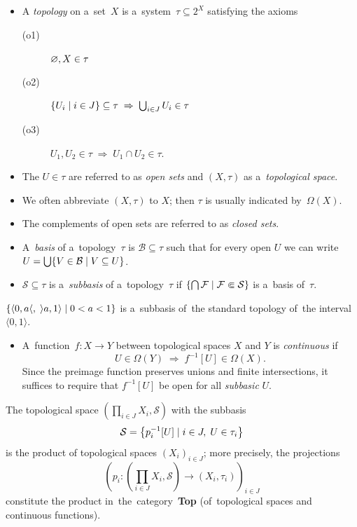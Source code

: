 \begin{itemize}
\item A \emph{topology} on a~set~$X$ is a~system~$\tau\subseteq 2^X$ satisfying
the axioms
  \begin{description}
  \item[(o1)] $\varnothing, X \in \tau$
  \item[(o2)] $\left\{ U_i \mid i\in J \right\} \subseteq \tau \; \Rightarrow \;
  \bigcup_{i\in J} U_i \in \tau$
  \item[(o3)] $U_1, U_2 \in \tau \; \Rightarrow \; U_1 \cap U_2 \in \tau$.
  \end{description}

\item The $U\in \tau$ are referred to as \emph{open sets\/} and $(X, \tau)$ as
a~\emph{topological space\/}.

\item We often abbreviate $(X, \tau)$ to $X$;
then $\tau$ is usually indicated by~$\Omega(X)$.

\item The complements of open sets are referred to as \emph{closed sets\/}.

\item A~\emph{basis} of a~topology~$\tau$ is $\mathcal{B}\subseteq \tau$ such
that for every open $U$ we can write $U = \bigcup \{V\in \mathcal{B} \mid
V\subseteq U \}$.

\item $\mathcal{S}\subseteq \tau$ is a~\emph{subbasis} of a~topology~$\tau$ if
$\left\{ \bigcap \mathcal{F} \mid \mathcal{F} \Subset \mathcal{S} \right\}$ is
a~basis of~$\tau$.
\end{itemize}

\begin{exmpl}
  $\{ \langle 0, a \langle, \; \rangle a, 1 \rangle \mid 0
  < a < 1 \}$ is a~subbasis of~the standard topology of~the interval $\langle
  0, 1\rangle$.
\end{exmpl}

\begin{itemize}
\item A~function~$f\colon X \to Y$ between topological spaces $X$ and $Y$ is
\emph{continuous} if 
\[
  U\in \Omega(Y) \; \Longrightarrow \; f^{-1}[U]\in \Omega(X).
\]
Since the preimage function preserves unions and finite intersections, it
suffices to require that $f^{-1}[U]$ be open for all \emph{subbasic\/} $U$.
\end{itemize}

\begin{exmpl}
  The topological space $\left( \prod_{i\in J} X_i, \mathcal{S} \right)$ with
  the subbasis
  \[
    \mathcal{S} = \left\{ p_{i}^{-1}[U] \mid i\in J, \; U\in \tau_i \right\}
  \]
  is the product of topological spaces $\left( X_i \right)_{i\in J}$;
  more precisely, the projections
  \[
    \left( p_i\colon \left(\prod_{i\in J} X_i, \mathcal{S}\right) \to
    \left(X_i, \tau_i\right) \right)_{i\in J}
  \]
  constitute the product in~the~category~{\bf Top} (of~topological spaces and
  continuous functions).
\end{exmpl}

